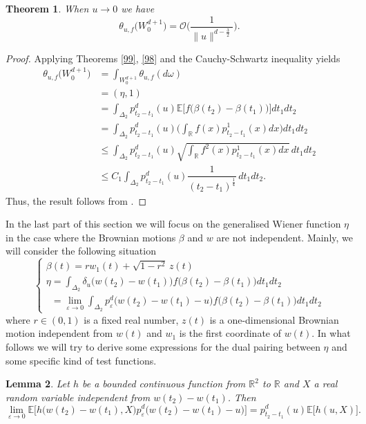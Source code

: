 \documentclass[]{interact}
\newcommand{\E}{{\mathbb{E}}}
\newcommand{\R}{{\mathbb{R}}}
\newcommand{\1}{\mathbf{1}}
\newcommand{\ve}{\varepsilon}
\theoremstyle{plain}%
\newtheorem{thm}{Theorem}[section]
\newtheorem{lem}[thm]{Lemma}
\theoremstyle{definition}
\theoremstyle{remark}
\begin{document}
\begin{thm}
When $u\to 0$ we have 
$$ \theta_{u,f} \Big( W_0^{d+1} \Big) = \mathcal{O} \Bigg( \dfrac{1}{ \|u\|^{d-\frac{3}{2}} }  \Bigg) .$$
\end{thm}

\begin{proof}
Applying Theorems \ref{99}, \ref{98} and the Cauchy-Schwartz inequality yields 
\begin{align*}
\theta_{u,f} \Big( W_0^{d+1} \Big) 
&=\int_{ W_0^{d+1} } \theta_{u,f}(d\omega)\\
&=(\eta,1)\\
&=\int_{\Delta_2  } p_{t_2-t_1}^d(u)\E \Big[f\big( \beta(t_2)-\beta(t_1)\big )\Big] dt_1dt_2\\
&=\int_{\Delta_2  } p_{t_2-t_1}^d(u) \Big(\int_{\R} f(x)p_{t_2-t_1}^1(x)dx \Big) dt_1dt_2\\
&\leqslant \int_{\Delta_2  } p_{t_2-t_1}^d(u) \sqrt{\int_{\R} f^2(x)p_{t_2-t_1}^1(x)dx} \, dt_1dt_2\\
&\leqslant C_1\int_{\Delta_2  } p_{t_2-t_1}^d(u) \dfrac{1}{(t_2-t_1) ^{ \frac{1}{4} } }  \, dt_1dt_2.
\end{align*}
Thus, the result follows from \cite[Proposition 1]{DS23}.
\end{proof}

In the last part of this section we will focus on the generalised Wiener function $\eta$ in the case where the Brownian motions $\beta$ and $w$ are not independent. Mainly, we will consider the following situation 
$$\begin{cases}
\beta(t)=r w_1(t)+\sqrt{1-r^2} \, z(t)\\
\displaystyle \eta=\int _{\Delta_2} \delta_u \big(w(t_2)-w(t_1) \big) f\big( \beta(t_2)-\beta(t_1)\big ) dt_1dt_2\\
\displaystyle\phantom{\eta}=\lim_{\varepsilon \to 0} \int_{\Delta_2  }  p^d_{\varepsilon}\big( w(t_2)-w(t_1)-u\big)f\big( \beta(t_2)-\beta(t_1)\big )    dt_1dt_2
\end{cases}  $$
where $r\in (0,1)$ is a fixed real number, $z(t)$ is a one-dimensional Brownian motion independent from $w(t)$ and $w_1$ is the first coordinate of $w(t)$. In what follows we will try to derive some expressions for the dual pairing between $\eta$ and some specific kind of test functions.

\begin{lem}\label{lem5}
Let $h$ be a bounded continuous function from $\R^2$ to $\R$ and $X$ a real random variable independent from $w(t_2)-w(t_1)$. Then 
$$ \lim_{\ve \to 0} \E \Big[ h\big( w(t_2)-w(t_1),X \big) p_\ve ^d\big( w(t_2)-w(t_1)-u\big)\Big]=p_{t_2-t_1}^d(u)\E \big[ h ( u,X ) \big]  . $$
\end{lem}
\end{document}
